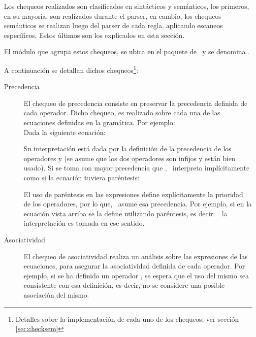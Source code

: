Los chequeos realizados son clasificados en sintácticos y semánticos, los primeros, en su mayoría, son realizados durante el parser, en cambio, los chequeos semánticos se realizan luego del parser de cada regla, aplicando escaneos específicos. Estos últimos son los explicados en esta sección.

El módulo que agrupa estos chequeos, se ubica en el paquete  de \maggen\ y se denomina .

A continuación se detallan dichos chequeos\footnote{Detalles sobre la implementación de cada uno de los chequeos, ver sección \ref{sec:checksem}}:

\begin{description}
\item [Precedencia] El chequeo de precedencia consiste en preservar la precedencia definida de cada operador. Dicho chequeo, es realizado sobre cada una de las ecuaciones definidas en la gramática. Por ejemplo:\\ Dada la siguiente ecuación:

\begin{center}
\end{center}

Su interpretación está dada por la definición de la precedencia de los operadores \textbtt{+} y \textbtt{*}(se asume que los dos operadores son infijos y están bien usado). Si se toma \textbtt{*} con mayor precedencia que \textbtt{+}, \maggen\ interpreta implícitamente como si la ecuación tuviera paréntesis:

\begin{center}
\end{center}

El uso de paréntesis en las expresiones define explícitamente la prioridad de los operadores, por lo que, \maggen\ asume esa precedencia. Por ejemplo, si en la ecuación vista arriba se la define utilizando paréntesis, es decir:\  
 \ la interpretación es tomada en ese sentido.

\item [Asociatividad] El chequeo de asociatividad realiza un análisis sobre las expresiones de las ecuaciones, para asegurar la asociatividad definida de cada operador. Por ejemplo, si se ha definido un operador , se espera que el uso del mismo sea consistente con esa definición, es decir, no se considere una posible asociación del mismo. 


\end{description}
